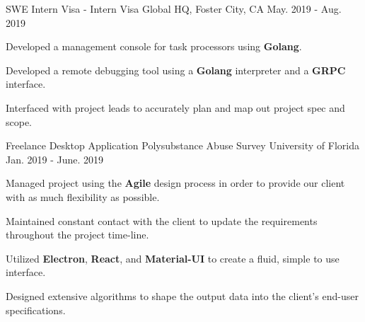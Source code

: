 


\begin{cventries}

	
	\cventry
	{SWE Intern} %
	{Visa - Intern} %
	{Visa Global HQ, Foster City, CA} %
	{May. 2019 - Aug. 2019} %
	{ %
		\begin{cvitems}
			\setlength{\itemindent}{.125in}
			\item {Developed a management console for task processors using \textbf{Golang}.}
			\item {Developed a remote debugging tool using a \textbf{Golang} interpreter and a \textbf{GRPC} interface.}
			\item {Interfaced with project leads to accurately plan and map out project spec and scope.}
		\end{cvitems}
	}
	
	
	\cventry
	{Freelance Desktop Application} %
	{Polysubstance Abuse Survey} %
	{University of Florida} %
	{Jan. 2019 - June. 2019} %
	{ %
		\begin{cvitems}
			\setlength{\itemindent}{.125in}
			\item {Managed project using the \textbf{Agile} design process in order to provide our client with as much flexibility as possible.}
			\item {Maintained constant contact with the client to update the requirements throughout the project time-line.}
			\item {Utilized \textbf{Electron}, \textbf{React}, and \textbf{Material-UI} to create a fluid, simple to use interface. }
			\item {Designed extensive algorithms to shape the output data into the client's end-user specifications.}
		\end{cvitems}
	}
	

\end{cventries}

